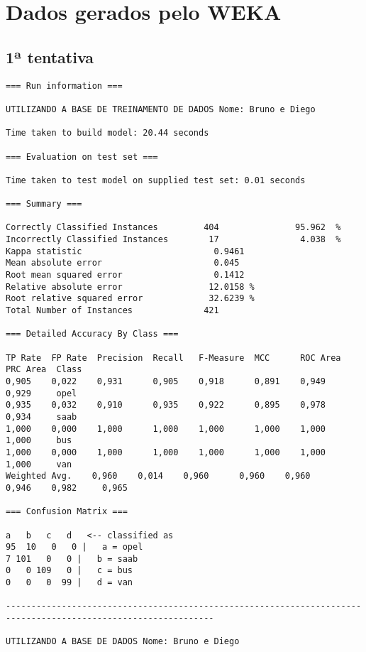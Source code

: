 \documentclass[
	article,			%
	11pt,				%
	oneside,			%
	a4paper,			%
	english,			%
	brazil,				%
	sumario=tradicional
	]{abntex2}
\begin{document}
\newpage 
\appendix
\chapter{Dados gerados pelo WEKA}

\section{1ª tentativa}

\begin{lstlisting}
=== Run information ===

UTILIZANDO A BASE DE TREINAMENTO DE DADOS Nome: Bruno e Diego

Time taken to build model: 20.44 seconds

=== Evaluation on test set ===

Time taken to test model on supplied test set: 0.01 seconds

=== Summary ===

Correctly Classified Instances         404               95.962  %
Incorrectly Classified Instances        17                4.038  %
Kappa statistic                          0.9461
Mean absolute error                      0.045 
Root mean squared error                  0.1412
Relative absolute error                 12.0158 %
Root relative squared error             32.6239 %
Total Number of Instances              421     

=== Detailed Accuracy By Class ===

TP Rate  FP Rate  Precision  Recall   F-Measure  MCC      ROC Area  PRC Area  Class
0,905    0,022    0,931      0,905    0,918      0,891    0,949     0,929     opel
0,935    0,032    0,910      0,935    0,922      0,895    0,978     0,934     saab
1,000    0,000    1,000      1,000    1,000      1,000    1,000     1,000     bus
1,000    0,000    1,000      1,000    1,000      1,000    1,000     1,000     van
Weighted Avg.    0,960    0,014    0,960      0,960    0,960      0,946    0,982     0,965     

=== Confusion Matrix ===

a   b   c   d   <-- classified as
95  10   0   0 |   a = opel
7 101   0   0 |   b = saab
0   0 109   0 |   c = bus
0   0   0  99 |   d = van

---------------------------------------------------------------------------------------------------------------

UTILIZANDO A BASE DE DADOS Nome: Bruno e Diego


\end{lstlisting}
\end{document}
